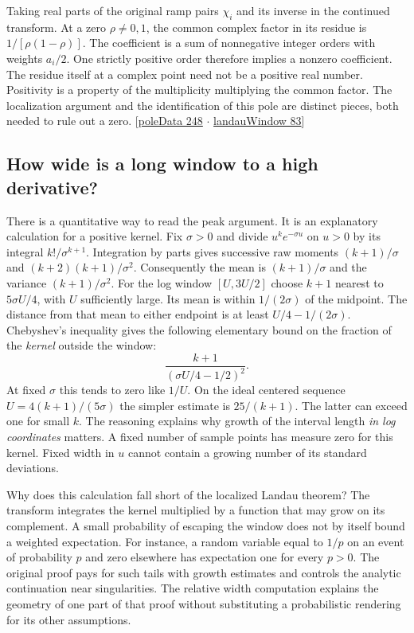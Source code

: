 \documentclass[12pt,letterpaper]{article}
\begin{document}
Taking real parts of the original ramp pairs $\chi_i$ and its inverse in the continued transform. At a zero $\rho\ne0,1$, the common complex factor in its residue is $1/[\rho(1-\rho)]$. The coefficient is a sum of nonnegative integer orders with weights $a_i/2$. One strictly positive order therefore implies a nonzero coefficient. The residue itself at a complex point need not be a positive real number. Positivity is a property of the multiplicity multiplying the common factor. The localization argument and the identification of this pole are distinct pieces, both needed to rule out a zero. {\small\sffamily\color{mute}[\href{https://github.com/nousentllc/riemann-hypothesis/blob/40e56bab026552e089d7afcfeff08d2defb9c005/src/Development/AutomorphicArithmetic/DedekindLFunctions/LandauTheorems/poleData.lean#L248}{poleData 248} $\cdot$ \href{https://github.com/nousentllc/riemann-hypothesis/blob/40e56bab026552e089d7afcfeff08d2defb9c005/src/Development/AutomorphicArithmetic/DedekindLFunctions/LandauTheorems/landauWindow.lean#L83}{landauWindow 83}]}



\subsection{How wide is a long window to a high derivative?}
There is a quantitative way to read the peak argument. It is an explanatory calculation for a positive kernel. Fix $\sigma>0$ and divide $u^k e^{-\sigma u}$ on $u>0$ by its integral $k!/\sigma^{k+1}$. Integration by parts gives successive raw moments $(k+1)/\sigma$ and $(k+2)(k+1)/\sigma^2$. Consequently the mean is $(k+1)/\sigma$ and the variance $(k+1)/\sigma^2$. For the log window $[U,3U/2]$ choose $k+1$ nearest to $5\sigma U/4$, with $U$ sufficiently large. Its mean is within $1/(2\sigma)$ of the midpoint. The distance from that mean to either endpoint is at least $U/4-1/(2\sigma)$. Chebyshev's inequality gives the following elementary bound on the fraction of the \emph{kernel} outside the window:
\[
   \frac{k+1}{(\sigma U/4-1/2)^2}.
\]
At fixed $\sigma$ this tends to zero like $1/U$. On the ideal centered sequence $U=4(k+1)/(5\sigma)$ the simpler estimate is $25/(k+1)$. The latter can exceed one for small $k$. The reasoning explains why growth of the interval length \emph{in log coordinates} matters. A fixed number of sample points has measure zero for this kernel. Fixed width in $u$ cannot contain a growing number of its standard deviations.

Why does this calculation fall short of the localized Landau theorem? The transform integrates the kernel multiplied by a function that may grow on its complement. A small probability of escaping the window does not by itself bound a weighted expectation. For instance, a random variable equal to $1/p$ on an event of probability $p$ and zero elsewhere has expectation one for every $p>0$. The original proof pays for such tails with growth estimates and controls the analytic continuation near singularities. The relative width computation explains the geometry of one part of that proof without substituting a probabilistic rendering for its other assumptions.
\end{document}
